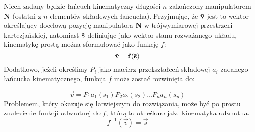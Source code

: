 \documentclass[11pt]{mwrep}
\begin{document}
 Niech zadany będzie łańcuch kinematyczny długości $n$ zakończony manipulatorem \textbf{N} (ostatni z $n$ elementów składowych łańcucha). Przyjmując, że $\bf\vec{v}$ jest to wektor określający docelową pozycję manipulatora \textbf{N} w trójwymiarowej przestrzeni kartezjańskiej, natomiast $\bf\vec{s}$ definiując jako wektor stanu rozważanego układu, kinematykę prostą można sformułować jako funkcję $f$:
$$
\bf\vec{v} = f(\bf\vec{s})
$$
Dodatkowo, jeżeli określimy $P_i$ jako macierz przekształceń składowej $a_i$ zadanego łańcucha kinematycznego, funkcja $f$ może zostać rozwinięta do:

$$
{\vec{v}} = P_1a_1({s_1})P_2a_2({s_2}) \dots P_na_n({s_n})
$$
Problemem, który okazuje się łatwiejszym do rozwiązania, może być po prostu znalezienie funkcji odwrotnej do $f$, którą to określono jako kinematyka odwrotna:
\nopagebreak
$$
f^{-1} (\vec{v})  = \vec{s}
$$
\end{document}
